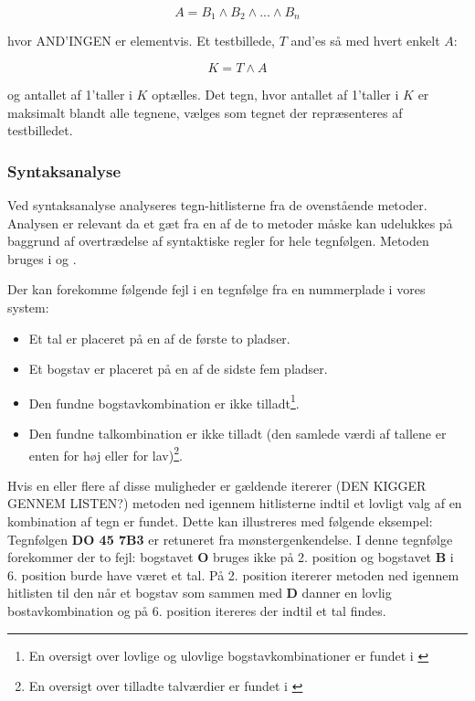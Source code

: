 \begin{displaymath}
A = B_1 \wedge B_2 \wedge ... \wedge B_n
\end{displaymath}

hvor AND'INGEN er elementvis. Et testbillede, $T$ and'es så med hvert enkelt $A$:

\begin{displaymath}
K = T \wedge A
\end{displaymath}

og antallet af 1'taller i $K$ optælles. Det tegn, hvor antallet af 1'taller i $K$ er maksimalt blandt alle tegnene, vælges som tegnet der repræsenteres af testbilledet.

\subsubsection{Syntaksanalyse}

Ved syntaksanalyse analyseres tegn-hitlisterne fra de ovenstående metoder. Analysen er relevant da et gæt fra en af de to metoder måske kan udelukkes på baggrund af overtrædelse af syntaktiske regler for hele tegnfølgen. Metoden bruges i \cite{nijhuis} og \cite{kwas}.

Der kan forekomme følgende fejl i en tegnfølge fra en nummerplade i vores system:

\begin{itemize}
\item Et tal er placeret på en af de første to pladser.
\item Et bogstav er placeret på en af de sidste fem pladser.
\item Den fundne bogstavkombination er ikke tilladt\footnote{En oversigt over lovlige og ulovlige bogstavkombinationer er fundet i \cite{bogstav_komb}}.
\item Den fundne talkombination er ikke tilladt (den samlede værdi af tallene er enten for høj eller for lav)\footnote{En oversigt over tilladte talværdier er fundet i \cite{nrpl}}.
\end{itemize}

Hvis en eller flere af disse muligheder er gældende itererer (DEN KIGGER GENNEM LISTEN?) metoden ned igennem hitlisterne indtil et lovligt valg af en kombination af tegn er fundet. Dette kan illustreres med følgende eksempel: Tegnfølgen \textbf{DO 45 7B3} er retuneret fra mønstergenkendelse. I denne tegnfølge forekommer der to fejl: bogstavet \textbf{O} bruges ikke på 2. position og bogstavet \textbf{B} i 6. position burde have været et tal. På 2. position itererer metoden ned igennem hitlisten til den når et bogstav som sammen med \textbf{D} danner en lovlig bostavkombination og på 6. position itereres der indtil et tal findes.

